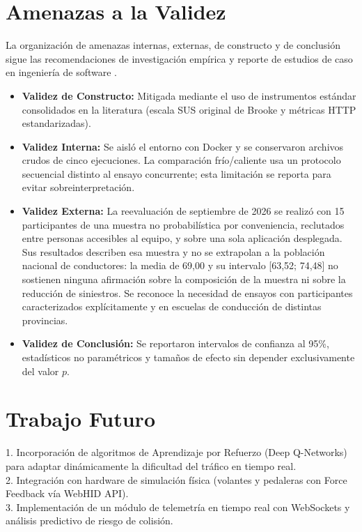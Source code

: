 \documentclass[11pt,a4paper]{report}
\begin{document}
\chapter{Amenazas a la Validez}
La organización de amenazas internas, externas, de constructo y de conclusión sigue las recomendaciones de investigación empírica y reporte de estudios de caso en ingeniería de software \cite{runeson2009guidelines}.
\begin{itemize}
    \item \textbf{Validez de Constructo:} Mitigada mediante el uso de instrumentos estándar consolidados en la literatura (escala SUS original de Brooke y métricas HTTP estandarizadas).
    \item \textbf{Validez Interna:} Se aisló el entorno con Docker y se conservaron archivos crudos de cinco ejecuciones. La comparación frío/caliente usa un protocolo secuencial distinto al ensayo concurrente; esta limitación se reporta para evitar sobreinterpretación.
    \item \textbf{Validez Externa:} La reevaluación de septiembre de 2026 se realizó con 15 participantes de una muestra no probabilística por conveniencia, reclutados entre personas accesibles al equipo, y sobre una sola aplicación desplegada. Sus resultados describen esa muestra y no se extrapolan a la población nacional de conductores: la media de 69,00 y su intervalo [63,52; 74,48] no sostienen ninguna afirmación sobre la composición de la muestra ni sobre la reducción de siniestros. Se reconoce la necesidad de ensayos con participantes caracterizados explícitamente y en escuelas de conducción de distintas provincias.
    \item \textbf{Validez de Conclusión:} Se reportaron intervalos de confianza al 95\%, estadísticos no paramétricos y tamaños de efecto sin depender exclusivamente del valor $p$.
\end{itemize}

\chapter{Trabajo Futuro}
1. Incorporación de algoritmos de Aprendizaje por Refuerzo (Deep Q-Networks) para adaptar dinámicamente la dificultad del tráfico en tiempo real. \\
2. Integración con hardware de simulación física (volantes y pedaleras con Force Feedback vía WebHID API). \\
3. Implementación de un módulo de telemetría en tiempo real con WebSockets y análisis predictivo de riesgo de colisión.
\end{document}
